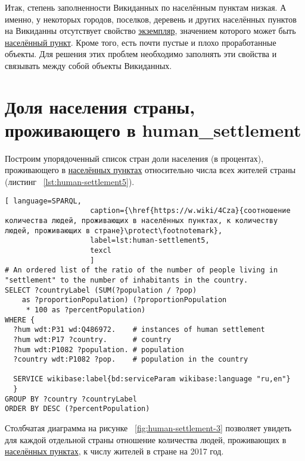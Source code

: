 Итак, степень заполненности Викиданных по населённым пунктам низкая. А именно, у некоторых городов, поселков, деревень и других населённых пунктов на Викиданны отсутствует свойство \href{http://www.wikidata.org/entity/Q21503252}{экземпляр}, значением которого может быть \href{http://www.wikidata.org/entity/Q486972}{населённый пункт}. Кроме того, есть почти пустые и плохо проработанные объекты. Для решения этих проблем необходимо заполнять эти свойства и связывать между собой объекты Викиданных.

\section{Доля населения страны, проживающего в human\_settlement}

Построим упорядоченный список стран доли населения (в процентах), проживающего в \href{http://www.wikidata.org/entity/Q486972}{населённых пунктах} относительно числа всех жителей страны (листинг ~\protect\ref{lst:human-settlement5}).

\begin{lstlisting}[ language=SPARQL, 
                    caption={\href{https://w.wiki/4Cza}{соотношение количества людей, проживающих в населённых пунктах, к количеству людей, проживающих в стране}\protect\footnotemark},
                    label=lst:human-settlement5,
                    texcl 
                    ]
# An ordered list of the ratio of the number of people living in 
"settlement" to the number of inhabitants in the country.
SELECT ?countryLabel (SUM(?population / ?pop) 
	as ?proportionPopulation) (?proportionPopulation
	 * 100 as ?percentPopulation)
WHERE {
  ?hum wdt:P31 wd:Q486972.    # instances of human settlement  
  ?hum wdt:P17 ?country.      # country 
  ?hum wdt:P1082 ?population. # population
  ?country wdt:P1082 ?pop.    # population in the country

  SERVICE wikibase:label{bd:serviceParam wikibase:language "ru,en"}
  }
GROUP BY ?country ?countryLabel
ORDER BY DESC (?percentPopulation)
\end{lstlisting}%

Столбчатая диаграмма на рисунке ~\ref{fig:human-settlement-3} позволяет увидеть для каждой отдельной страны отношение количества людей, проживающих в \href{http://www.wikidata.org/entity/Q486972}{населённых пунктах}, к числу жителей в стране на 2017 год.

